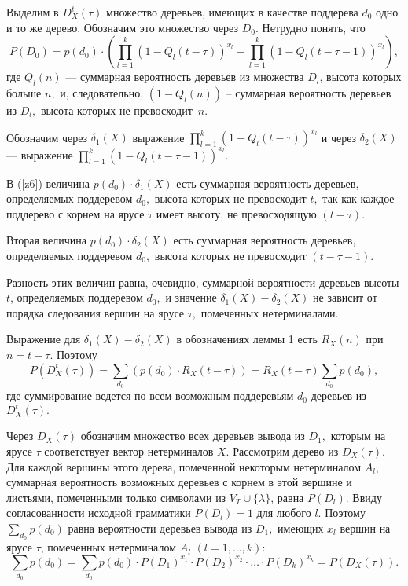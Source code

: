 \documentclass[%
11pt,a4paper]{article}
\begin{document}
{{{Выделим в $D_X^t(\tau)$ множество деревьев, имеющих в качестве поддерева
$d_0$ одно и то же дерево. Обозначим это множество через $D_0.$
Нетрудно понять, что
\begin{equation}
P\left(D_0\right)=
p(d_0)\cdot
\left(\prod_{l=1}^k (1-Q_l(t-\tau))^{x_l} -
\prod_{l=1}^k (1-Q_l(t-\tau-1))^{x_l}\right),
\label{z6}
\end{equation}
где $Q_l(n)$ --- суммарная вероятность деревьев из множества $D_l$,
высота которых больше $n,$ и, следовательно,
$\left(1-Q_l(n)\right)$ -- суммарная вероятность деревьев из
$D_l,$ высота которых не превосходит~$n.$

Обозначим через $\delta_1(X)$ выражение
$\prod_{l=1}^k (1-Q_l(t-\tau))^{x_l} $
и через $\delta_2(X)$ --- выражение
$ \prod_{l=1}^k (1-Q_l(t-\tau-1))^{x_l}.$

В (\ref{z6}) величина $p(d_0)\cdot\delta_1(X) $
есть суммарная вероятность деревьев, определяемых поддеревом $d_0,$
высота которых не превосходит $t,$ так как каждое поддерево с корнем
на ярусе $\tau$ имеет высоту, не превосходящую $(t-\tau).$

Вторая величина $p(d_0)\cdot\delta_2(X) $
есть суммарная вероятность деревьев, определяемых поддеревом $d_0,$
высота которых не превосходит $(t-\tau-1).$

Разность этих величин равна, очевидно, суммарной вероятности
деревьев высоты $t$, определяемых поддеревом $d_0,$ и значение
$\delta_1(X)-\delta_2(X)$ не зависит от порядка следования
вершин на ярусе $\tau,$ помеченных нетерминалами.

Выражение для $\delta_1(X)-\delta_2(X)$ в обозначениях леммы 1 есть $R_X(n)$ при $n=t-\tau.$  
 Поэтому
$$
P(D_X^t(\tau))=\sum_{d_0}\left( p(d_0)\cdot R_X(t-\tau)\right) =
R_X(t-\tau)\sum_{d_0}p(d_0),
$$
где суммирование ведется по всем возможным поддеревьям $d_0$
деревьев из $D_X^t(\tau).$

Через $D_X(\tau)$ обозначим множество всех деревьев вывода из $D_1,$ которым на ярусе $\tau$ соответствует вектор нетерминалов $X.$ Рассмотрим дерево из $D_X(\tau).$ Для каждой вершины этого дерева, помеченной некоторым нетерминалом $A_l,$ суммарная вероятность возможных деревьев с корнем в этой вершине
и листьями, помеченными только символами из $V_T\cup \{\lambda\}$, равна $P(D_l).$
Ввиду согласованности исходной грамматики $P(D_l)=1$ для любого $l$.
Поэтому $\sum_{d_0}p(d_0)$ равна вероятности деревьев вывода из $D_1,$ имеющих $x_l$ вершин на ярусе
$\tau$, помеченных нетерминалом $A_l$ $(l=1,\ldots,k):$
$$
\sum_{d_0}p(d_0)=
\sum_{d_0}p(d_0) \cdot P(D_1)^{x_1} \cdot P(D_2)^{x_2}\cdot \ldots
\cdot P(D_k)^{x_k}=P\left(D_X(\tau)\right).
$$

}}}
\end{document}
